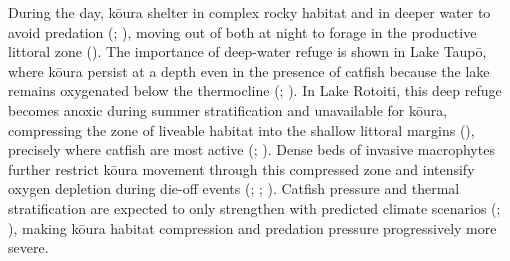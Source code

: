 \documentclass[
  letterpaper,
  DIV=11,
  numbers=noendperiod]{scrartcl}
\begin{document}
During the day, kōura shelter in complex rocky habitat and in deeper
water to avoid predation (; ), moving
out of both at night to forage in the productive littoral zone
(). The importance of
deep-water refuge is shown in Lake Taupō, where kōura persist at a depth
even in the presence of catfish because the lake remains oxygenated
below the thermocline (; ). In Lake
Rotoiti, this deep refuge becomes anoxic during summer stratification
and unavailable for kōura, compressing the zone of liveable habitat into
the shallow littoral margins (), precisely where catfish are most active
(;
). Dense beds of invasive
macrophytes further restrict kōura movement through this compressed zone
and intensify oxygen depletion during die-off events
(;
;
). Catfish pressure and
thermal stratification are expected to only strengthen with predicted
climate scenarios (;
), making kōura habitat
compression and predation pressure progressively more severe.
\end{document}
